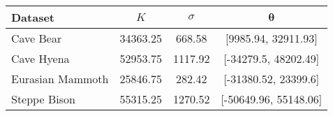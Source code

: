 
\begin{tabular}{lccc}
\toprule
Dataset & $K$ & $\sigma$ & $\bm{\theta}$\\
\midrule
Cave Bear & 34363.25 & 668.58 & {}[9985.94, 32911.93]\\
Cave Hyena & 52953.75 & 1117.92 & {}[-34279.5, 48202.49]\\
Eurasian Mammoth & 25846.75 & 282.42 & {}[-31380.52, 23399.6]\\
Steppe Bison & 55315.25 & 1270.52 & {}[-50649.96, 55148.06]\\
\bottomrule
\end{tabular}
